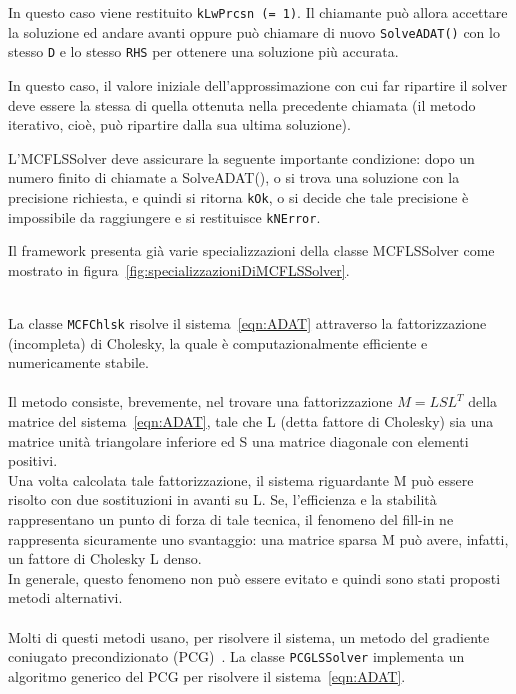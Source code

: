\begin{itemize}
In questo caso viene restituito \texttt{kLwPrcsn (= 1)}. Il chiamante può allora accettare la soluzione ed andare avanti oppure può chiamare di nuovo \texttt{SolveADAT()} con lo stesso \texttt{D} e lo stesso \texttt{RHS} per ottenere una soluzione più accurata.

In questo caso, il valore iniziale dell’approssimazione con cui far ripartire il solver deve essere la stessa di quella ottenuta nella precedente chiamata (il metodo iterativo, cioè, può ripartire dalla sua ultima soluzione). 

L’MCFLSSolver deve assicurare la seguente importante condizione: dopo un numero finito di chiamate a SolveADAT(), o si trova una soluzione con la precisione richiesta, e quindi si ritorna \texttt{kOk}, o si decide che tale precisione è impossibile da raggiungere e si restituisce \texttt{kNError}.

\end{itemize}

Il framework presenta già varie specializzazioni della classe MCFLSSolver come mostrato in figura~\vref{fig:specializzazioniDiMCFLSSolver}.\\
\\

La classe \texttt{MCFChlsk} risolve il sistema~\eqref{eqn:ADAT} attraverso la fattorizzazione (incompleta) di Cholesky, la quale è computazionalmente efficiente e numericamente stabile.\\ 
\\
Il metodo consiste, brevemente, nel trovare una fattorizzazione $M = LSL^T$ della matrice del sistema~\eqref{eqn:ADAT}, tale che L (detta fattore di Cholesky) sia una matrice unità triangolare inferiore ed S una matrice diagonale con elementi positivi.\\

Una volta calcolata tale fattorizzazione, il sistema riguardante M può essere risolto con due sostituzioni in avanti su L. Se, l’efficienza e la stabilità rappresentano un punto di forza di tale tecnica, il fenomeno del fill-in ne rappresenta sicuramente uno svantaggio: una matrice sparsa M può avere, infatti, un fattore di Cholesky L denso.\\

In generale, questo fenomeno non può essere evitato e quindi sono stati proposti metodi alternativi.\\
\\
Molti di questi metodi usano, per risolvere il sistema, un metodo del gradiente coniugato precondizionato (PCG)~\cite{KKT_frangio}.
La classe \texttt{PCGLSSolver} implementa un algoritmo generico del PCG per risolvere il sistema~\eqref{eqn:ADAT}.

